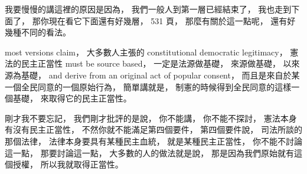 \hypertarget{w02:cue:1806}{}我要慢慢的講這裡的原因是因為，
\hypertarget{w02:cue:1807}{}我們一般人到第一層已經結束了，
\hypertarget{w02:cue:1808}{}我也走到下面了，
\hypertarget{w02:cue:1809}{}那你現在看它下面還有好幾層，
\hypertarget{w02:cue:1810}{}531 頁，
\hypertarget{w02:cue:1811}{}那麼有關於這一點呢，
\hypertarget{w02:cue:1812}{}還有好幾種不同的看法。

\hypertarget{w02:cue:1813}{}most versions claim，
\hypertarget{w02:cue:1814}{}大多數人主張的 constitutional democratic legitimacy，
\hypertarget{w02:cue:1815}{}憲法的民主正當性 must be source based，
\hypertarget{w02:cue:1816}{}一定是法源做基礎，
\hypertarget{w02:cue:1817}{}來源做基礎，
\hypertarget{w02:cue:1818}{}以來源為基礎，
\hypertarget{w02:cue:1819}{}and derive from an original act of popular consent，
\hypertarget{w02:cue:1820}{}而且是來自於某一個全民同意的一個原始行為，
\hypertarget{w02:cue:1821}{}簡單講就是，
\hypertarget{w02:cue:1822}{}制憲的時候得到全民同意的這樣一個基礎，
\hypertarget{w02:cue:1823}{}來取得它的民主正當性。

\hypertarget{w02:cue:1824}{}剛才我不要忘記，
\hypertarget{w02:cue:1825}{}我們剛才批評的是說，
\hypertarget{w02:cue:1826}{}你不能講，
\hypertarget{w02:cue:1827}{}你不能不探討，
\hypertarget{w02:cue:1828}{}憲法本身有沒有民主正當性，
\hypertarget{w02:cue:1829}{}不然你就不能滿足第四個要件，
\hypertarget{w02:cue:1830}{}第四個要件說，
\hypertarget{w02:cue:1831}{}司法所談的那個法律，
\hypertarget{w02:cue:1832}{}法律本身要具有某種民主血統，
\hypertarget{w02:cue:1833}{}就是某種民主正當性，
\hypertarget{w02:cue:1834}{}你不能不討論這一點，
\hypertarget{w02:cue:1835}{}那要討論這一點，
\hypertarget{w02:cue:1836}{}大多數的人的做法就是說，
\hypertarget{w02:cue:1837}{}那是因為我們原始就有這個授權，
\hypertarget{w02:cue:1838}{}所以我就取得正當性。

